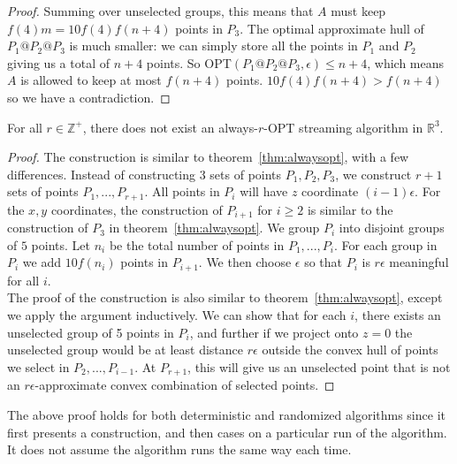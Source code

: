 \begin{proof}
Summing over unselected groups, this means that $A$ must keep $f(4)m = 10f(4)f(n+4)$ points in $P_3$. The optimal approximate hull of $P_1 @ P_2 @ P_3$ is much smaller: we can simply store all the points in $P_1$ and $P_2$ giving us a total of $n + 4$ points. So OPT$(P_1 @ P_2 @ P_3, \epsilon) \leq n + 4$, which means $A$ is allowed to keep at most $f(n+4)$ points. $10f(4)f(n+4) > f(n+4)$ so we have a contradiction. 

\end{proof}

\begin{theorem}
For all $r \in \mathbb{Z}^+$, there does not exist an always-$r$-OPT streaming algorithm in $\mathbb{R}^3$.
\label{thm:alwaysropt}
\end{theorem}

\begin{proof}
The construction is similar to theorem~\ref{thm:alwaysopt}, with a few differences. Instead of constructing 3 sets of points $P_1, P_2, P_3$, we construct $r+1$ sets of points $P_1, ..., P_{r+1}$. All points in $P_i$ will have $z$ coordinate $(i-1)\epsilon$. For the $x, y$ coordinates, the construction of $P_{i+1}$ for $i \geq 2$ is similar to the construction of $P_3$ in theorem~\ref{thm:alwaysopt}. We group $P_i$ into disjoint groups of $5$ points. Let $n_i$ be the total number of points in $P_1, ..., P_i$. For each group in $P_i$ we add $10f(n_i)$ points in $P_{i+1}$. We then choose $\epsilon$ so that $P_i$ is $r\epsilon$ meaningful for all $i$.
\\

The proof of the construction is also similar to theorem~\ref{thm:alwaysopt}, except we apply the argument inductively. We can show that for each $i$, there exists an unselected group of 5 points in $P_i$, and further if we project onto $z=0$ the unselected group would be at least distance $r\epsilon$ outside the convex hull of points we select in $P_2, ..., P_{i-1}$. At $P_{r+1}$, this will give us an unselected point that is not an $r\epsilon$-approximate convex combination of selected points.
\end{proof}

\begin{corollary}
The above proof holds for both deterministic and randomized algorithms since it first presents a construction, and then cases on a particular run of the algorithm. It does not assume the algorithm runs the same way each time.
\end{corollary}

